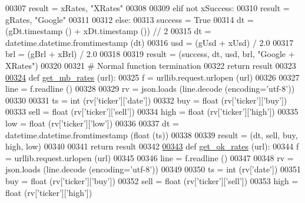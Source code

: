 \begin{DoxyCode}
{{{00307         result = xRates, \textcolor{stringliteral}{"XRates"}
00308         
00309     \textcolor{keywordflow}{elif} \textcolor{keywordflow}{not} xSuccess:
00310         result = gRates, \textcolor{stringliteral}{"Google"}
00311         
00312     \textcolor{keywordflow}{else}: 
00313         success = \textcolor{keyword}{True}
00314         dt  = (gDt.timestamp () + xDt.timestamp ()) // 2
00315         dt = datetime.datetime.fromtimestamp (dt)
00316         usd = (gUsd + xUsd) / 2.0
00317         brl = (gBrl + xBrl) / 2.0
00318         
00319         result = (success, dt, usd, brl, \textcolor{stringliteral}{"Google + XRates"})
00320         
00321     \textcolor{comment}{# Normal function termination}
00322     \textcolor{keywordflow}{return} result        
00323 
\hyperlink{namespaceexch2exch_a4226f3cef9fff15993d8b230a5cb92e4}{00324} \textcolor{keyword}{def }\hyperlink{namespaceexch2exch_a4226f3cef9fff15993d8b230a5cb92e4}{get\_mb\_rates} (url):
00325     f = urllib.request.urlopen (url)
00326     
00327     line = f.readline ()
00328     
00329     rv = json.loads (line.decode (encoding=\textcolor{stringliteral}{'utf-8'}))
00330     
00331     ts   = int   (rv[\textcolor{stringliteral}{'ticker'}][\textcolor{stringliteral}{'date'}])
00332     buy  = float (rv[\textcolor{stringliteral}{'ticker'}][\textcolor{stringliteral}{'buy'}])
00333     sell = float (rv[\textcolor{stringliteral}{'ticker'}][\textcolor{stringliteral}{'sell'}])
00334     high = float (rv[\textcolor{stringliteral}{'ticker'}][\textcolor{stringliteral}{'high'}])
00335     low  = float (rv[\textcolor{stringliteral}{'ticker'}][\textcolor{stringliteral}{'low'}])
00336     
00337     dt = datetime.datetime.fromtimestamp (float (ts))
00338     
00339     result = (dt, sell, buy, high, low)
00340     
00341     \textcolor{keywordflow}{return} result
00342 
\hyperlink{namespaceexch2exch_a157dc1519ab4a24783fab8bf7db9c17e}{00343} \textcolor{keyword}{def }\hyperlink{namespaceexch2exch_a157dc1519ab4a24783fab8bf7db9c17e}{get\_ok\_rates} (url):
00344     f = urllib.request.urlopen (url)
00345     
00346     line = f.readline ()
00347     
00348     rv = json.loads (line.decode (encoding=\textcolor{stringliteral}{'utf-8'}))
00349     
00350     ts   = int   (rv[\textcolor{stringliteral}{'date'}])
00351     buy  = float (rv[\textcolor{stringliteral}{'ticker'}][\textcolor{stringliteral}{'buy'}])
00352     sell = float (rv[\textcolor{stringliteral}{'ticker'}][\textcolor{stringliteral}{'sell'}])
00353     high = float (rv[\textcolor{stringliteral}{'ticker'}][\textcolor{stringliteral}{'high'}])
}}}
\end{DoxyCode}
